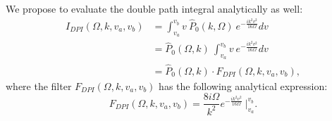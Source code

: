 We propose to evaluate the double path integral analytically as well:
\begin{align}
\label{eq:dpi_pr}
I_{DPI}(\Omega,k,v_a,v_b) & = \int^{v_b}_{v_a} v\ \hat{P}_0(k,\Omega)\ e^{-\frac{i k^2 v^2}{16\Omega}}dv\ \nonumber \\
& = \hat{P}_0(\Omega,k)\ \int^{v_b}_{v_a} v\ e^{-\frac{i k^2 v^2}{16\Omega}}dv \nonumber \\
& =  \hat{P}_0(\Omega,k) \cdot F_{DPI}(\Omega,k,v_a,v_b),
\end{align}
where the filter $F_{DPI}(\Omega,k,v_a,v_b)$ has the following analytical expression:
\begin{equation}
\label{eq:dpi_pr2}
F_{DPI}(\Omega,k,v_a,v_b) = \frac {8 i \Omega}{k^2} e^{-\frac{ik^2v^2}{16\Omega}}\ \bigg|_{v_a}^{v_b}.
\end{equation}



